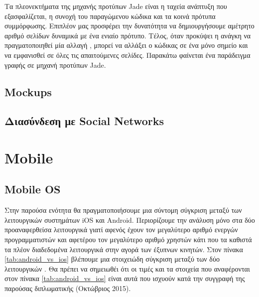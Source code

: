 Τα πλεονεκτήματα της μηχανής προτύπων Jade είναι η ταχεία ανάπτυξη που εξασφαλίζεται, η συνοχή του παραγώμενου κώδικα και τα κοινά πρότυπα συμμόρφωσης. Επιπλέον μας προσφέρει την δυνατότητα να δημιουργήσουμε αμέτρητο αριθμό σελίδων δυναμικά με ένα ενιαίο πρότυπο. Τέλος, όταν προκύψει η ανάγκη να πραγματοποιηθεί μία αλλαγή , μπορεί  να αλλάξει ο κώδικας σε ένα μόνο σημείο και να εμφανισθεί σε όλες τις απαιτούμενες σελίδες. Παρακάτω	φαίνεται ένα παράδειγμα γραφής σε μηχανή προτύπων Jade.
	
	
	\subsection{Mockups}
	\subsection{Διασύνδεση με Social Networks}

\section{Mobile}
	\subsection{Mobile OS}
		Στην παρούσα ενότητα θα πραγματοποιήσουμε μια σύντομη σύγκριση μεταξύ των λειτουργικών συστημάτων iOS και Android. Περιορίζουμε την ανάλυση μόνο στα δύο προαναφερθείσα λειτουργικά γιατί αφενός έχουν τον μεγαλύτερο αριθμό ενεργών προγραμματιστών και αφετέρου τον μεγαλύτερο αριθμό χρηστών κάτι που τα καθιστά τα πλέον διαδεδομένα λειτουργικά στην αγορά των έξυπνων κινητών. Στον πίνακα \ref{tab:android_vs_ios} βλέπουμε μια στοιχειώδη σύγκριση μεταξύ των δύο λειτουργικών \cite{smartphoneMarketShare}\cite{androidPublish}\cite{applePublish}\cite{androidSource}. Θα πρέπει να σημειωθέι ότι οι τιμές και τα στοιχεία που αναφέρονται στον πίνακα \ref{tab:android_vs_ios} είναι αυτά που ισχυούν κατά την συγγραφή της παρούσας διπλωματικής (Οκτώβριος 2015).
		
